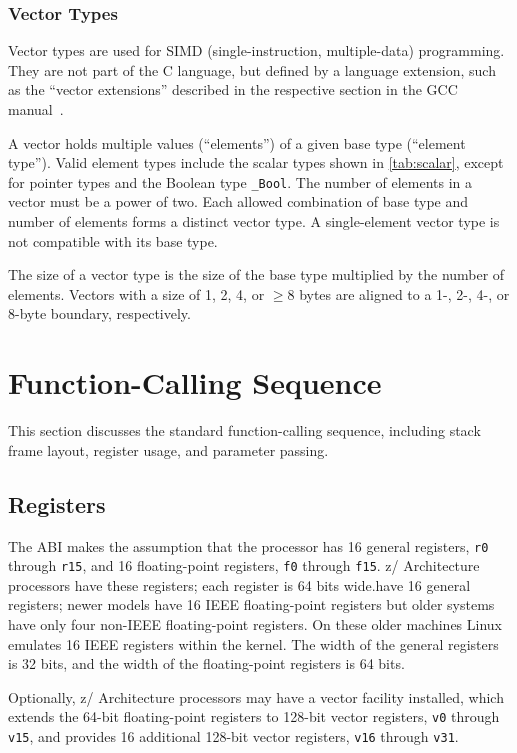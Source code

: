 \documentclass[english,11pt,twoside,toc=bib,toc=idx]{scrreprt}
\newcommand{\ARCH}{z/\kern-1pt Ar\-chi\-tec\-ture}
\newcommand{\ARCH}{ESA/390}
\begin{document}
\subsubsection{Vector Types}
Vector types are used for SIMD (single-instruction,
multiple-data) programming.  They are not part of the C language, but
defined by a language extension, such as the ``vector extensions''
described in the respective section in the GCC manual~\cite{gnu-vec}.

A vector holds multiple values (``elements'') of a given
base type (``element type'').  Valid element types include the scalar
types shown in \cref{tab:scalar}, except for pointer types and the Boolean
type \texttt{\_Bool}.  The number of elements in a vector must be a power
of two.  Each allowed combination of base type and number of elements
forms a distinct vector type.  A single-element vector type is not
compatible with its base type.

The size of a vector type is the size of the base type multiplied by the
number of elements.  Vectors with a size of 1, 2, 4, or $\ge 8$ bytes are
aligned to a 1-, 2-, 4-, or 8-byte boundary, respectively.

\section{Function-Calling Sequence}
This section discusses the standard function-calling sequence,
including stack frame layout, register usage, and parameter passing.

\subsection{Registers}
The ABI makes the assumption that the processor has 16 general registers,
\texttt{r0} through \texttt{r15}, and 16 floating-point registers,
\texttt{f0} through \texttt{f15}.  \ARCH{} processors {\ifzseries have
  these registers; each register is 64 bits wide.\else have 16 general
  registers; newer models have 16 IEEE floating-point registers but older
  systems have only four non-IEEE floating-point registers.  On these
  older machines Linux emulates 16 IEEE registers within the kernel.  The
  width of the general registers is 32 bits, and the width of the
  floating-point registers is 64 bits.\fi}%

Optionally, \ARCH{} processors may have a vector facility installed, which
extends the 64-bit floating-point registers to 128-bit vector registers,
\texttt{v0} through \texttt{v15}, and provides 16 additional 128-bit
vector registers, \texttt{v16} through \texttt{v31}.
\end{document}
